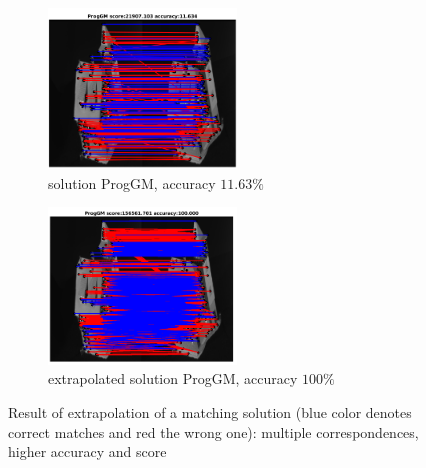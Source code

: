 \begin{figure}[h]\centering
		\begin{subfigure}[b]{0.45\textwidth}
			\centering
			\includegraphics[width=5cm]{"chapter3/fig/HouseSeq2/anchor_descr/using_cpd_afftrafo/solution/fi_1_ProgGM"} 
			\caption{\scriptsize solution ProgGM, accuracy $11.63\%$}
		\end{subfigure} 
		\begin{subfigure}[b]{0.45\textwidth}
			\centering
			\includegraphics[width=5cm]{"chapter3/fig/HouseSeq2/anchor_descr/using_cpd_afftrafo/ext_solution/fi_1_ProgGM"} 
			\caption{\scriptsize extrapolated solution ProgGM, accuracy $100\%$}
		\end{subfigure}
	\caption[Result of the extrapolation of a matching solution]{Result of extrapolation of a matching solution (blue color denotes correct matches and red the wrong one): multiple correspondences, higher accuracy and score} \label{fig:sol_ext}
\end{figure}

